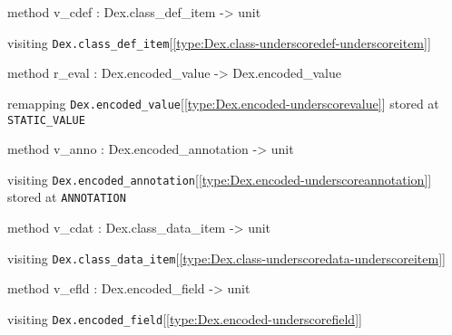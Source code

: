 \documentclass[11pt]{article}
\begin{document}
\begin{ocamldocobjectend}
\begin{ocamldocdescription}
\end{ocamldocdescription}


\label{method:Visitor.visitor.v-underscorecdef}\begin{ocamldoccode}
method v_cdef : Dex.class_def_item -> unit
\end{ocamldoccode}
\begin{ocamldocdescription}
visiting {\tt{Dex.class\_def\_item}}[\ref{type:Dex.class-underscoredef-underscoreitem}]


\end{ocamldocdescription}


\label{method:Visitor.visitor.r-underscoreeval}\begin{ocamldoccode}
method r_eval : Dex.encoded_value -> Dex.encoded_value
\end{ocamldoccode}
\begin{ocamldocdescription}
remapping {\tt{Dex.encoded\_value}}[\ref{type:Dex.encoded-underscorevalue}] stored at {\tt{STATIC\_VALUE}}


\end{ocamldocdescription}


\label{method:Visitor.visitor.v-underscoreanno}\begin{ocamldoccode}
method v_anno : Dex.encoded_annotation -> unit
\end{ocamldoccode}
\begin{ocamldocdescription}
visiting {\tt{Dex.encoded\_annotation}}[\ref{type:Dex.encoded-underscoreannotation}] stored at {\tt{ANNOTATION}}


\end{ocamldocdescription}


\label{method:Visitor.visitor.v-underscorecdat}\begin{ocamldoccode}
method v_cdat : Dex.class_data_item -> unit
\end{ocamldoccode}
\begin{ocamldocdescription}
visiting {\tt{Dex.class\_data\_item}}[\ref{type:Dex.class-underscoredata-underscoreitem}]


\end{ocamldocdescription}


\label{method:Visitor.visitor.v-underscoreefld}\begin{ocamldoccode}
method v_efld : Dex.encoded_field -> unit
\end{ocamldoccode}
\begin{ocamldocdescription}
visiting {\tt{Dex.encoded\_field}}[\ref{type:Dex.encoded-underscorefield}]



\end{ocamldocdescription}
\end{ocamldocobjectend}
\end{document}
